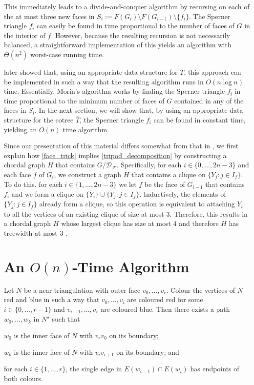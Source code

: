 \documentclass{patmorin}
\begin{document}
This immediately leads to a divide-and-conquer algorithm by recursing on each of the at most three new faces in $S_i:=F(G_i)\setminus F(G_{i-1})\setminus \{f_i\}$.  The Sperner triangle $f_i$ can easily be found in time proportional to the number of faces of $G$ in the interior of $f$.  However, because the resulting recursion is not necessarily balanced, a straightforward implementation of this yields an algorithm with $\Theta(n^2)$ worst-case running time.

\citet{morin:fast} later showed that, using an appropriate data structure for $T$, this approach can be implemented in such a way that the resulting algorithm runs in $O(n\log n)$ time.  Essentially, Morin's algorithm works by finding the Sperner triangle $f_i$ in time proportional to the minimum number of faces of $G$ contained in any of the faces in $S_i$.  In the next section, we will show that, by using an appropriate data structure for the cotree $\overline{T}$, the Sperner triangle $f_i$ can be found in constant time, yielding an $O(n)$ time algorithm.

Since our presentation of this material differs somewhat from that in \cite{dujmovic.joret.ea:planar,ueckerdt.wood.ea:XX}, we first explain how \cref{face_trick} implies \cref{tripod_decomposition} by constructing a chordal graph $H$ that contains $G/\mathcal{D_F}$.  Specifically, for each $i\in\{0,\ldots,2n-3\}$ and each face $f$ of $G_i$, we construct a graph $H$ that contains a clique on $\{Y_j:j\in I_f\}$.  To do this, for each $i\in\{1,\ldots,2n-3\}$ we let $f$ be the face of $G_{i-1}$ that contains $f_i$ and we form a clique on $\{Y_i\}\cup\{Y_j:j\in I_f\}$.  Inductively, the elements of $\{Y_j:j\in I_f\}$ already form a clique, so this operation is equivalent to attaching $Y_i$ to all the vertices of an existing clique of size at most $3$. Therefore, this results in a chordal graph $H$ whose largest clique has size at most $4$ and therefore $H$ has treewidth at most $3$ \cite{gavril:intersection}.

\section{An $O(n)$-Time Algorithm}


\begin{lem}
  Let $N$ be a near triangulation with outer face $v_0,\ldots,v_r$. Colour the vertices of $N$ red and blue in such a way that $v_0,\ldots,v_i$ are coloured red for some $i\in\{0,\ldots,r-1\}$ and $v_{i+1},\ldots,v_r$ are coloured blue.  Then there exists a path $w_0,\ldots,w_k$ in $N^\star$ such that
  \begin{compactenum}
    \item $w_0$ is the inner face of $N$ with $v_rv_0$ on its boundary;
    \item $w_k$ is the inner face of $N$ with $v_iv_{i+1}$ on its boundary; and
    \item for each $i\in\{1,\ldots,r\}$, the single edge in $E(w_{i-1})\cap E(w_i)$ has endpoints of both colours.
  \end{compactenum}
\end{lem}
\end{document}
